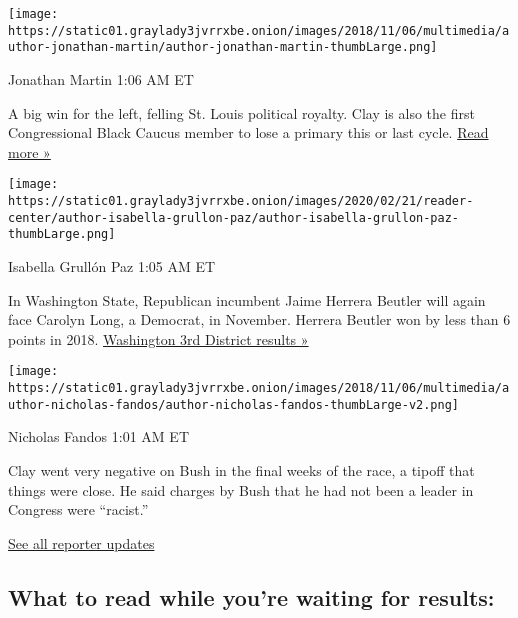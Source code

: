 \texttt{[image: https://static01.graylady3jvrrxbe.onion/images/2018/11/06/multimedia/author-jonathan-martin/author-jonathan-martin-thumbLarge.png]}

Jonathan Martin 1:06 AM ET

A big win for the left, felling St. Louis political royalty. Clay is
also the first Congressional Black Caucus member to lose a primary this
or last cycle.
\href{https://www.nytimes3xbfgragh.onion/2020/08/05/us/politics/cori-bush-missouri-william-lacy-clay.html?action=click\&module=ELEX_results\&pgtype=Interactive\&region=ReporterUpdates}{Read
more »}

\texttt{[image: https://static01.graylady3jvrrxbe.onion/images/2020/02/21/reader-center/author-isabella-grullon-paz/author-isabella-grullon-paz-thumbLarge.png]}

Isabella Grullón Paz 1:05 AM ET

In Washington State, Republican incumbent Jaime Herrera Beutler will
again face Carolyn Long, a Democrat, in November. Herrera Beutler won by
less than 6 points in 2018.
\href{https://www.nytimes3xbfgragh.onion/interactive/2020/08/04/us/elections/results-washington-house-district-3-primary-election.html?action=click\&module=ELEX_results\&pgtype=Interactive\&region=ReporterUpdates}{Washington
3rd District results »}

\texttt{[image: https://static01.graylady3jvrrxbe.onion/images/2018/11/06/multimedia/author-nicholas-fandos/author-nicholas-fandos-thumbLarge-v2.png]}

Nicholas Fandos 1:01 AM ET

Clay went very negative on Bush in the final weeks of the race, a tipoff
that things were close. He said charges by Bush that he had not been a
leader in Congress were ``racist.''

\href{https://www.nytimes3xbfgragh.onion/interactive/2020/08/04/us/elections/live-analysis-arizona-kansas-michigan-missouri-primaries.html?action=click\&module=ELEX_results\&pgtype=Interactive\&region=Component}{See
all reporter updates}

\hypertarget{what-to-read-while-youre-waiting-for-results}{%
\subsection{What to read while you're waiting for
results:}\label{what-to-read-while-youre-waiting-for-results}}

\href{https://www.nytimes3xbfgragh.onion/2020/08/04/us/elections/primary-election-michigan-arizona-kansas.html?action=click\&module=ELEX_results\&pgtype=Interactive\&region=RelatedCoverage}{}


